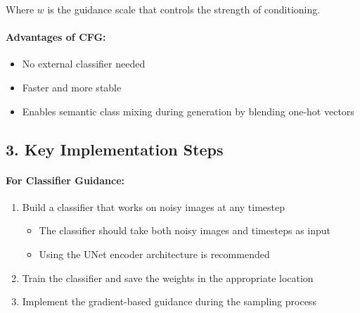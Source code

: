 Where $w$ is the guidance scale that controls the strength of conditioning.

\paragraph{Advantages of CFG:}
\begin{itemize}
    \item No external classifier needed
    \item Faster and more stable
    \item Enables semantic class mixing during generation by blending one-hot vectors
\end{itemize}
\subsection*{3. Key Implementation Steps}

\paragraph{For Classifier Guidance:}
\begin{enumerate}
    \item Build a classifier that works on noisy images at any timestep
    \begin{itemize}
        \item The classifier should take both noisy images and timesteps as input
        \item Using the UNet encoder architecture is recommended
    \end{itemize}
    \item Train the classifier and save the weights in the appropriate location
    \item Implement the gradient-based guidance during the sampling process
\end{enumerate}

